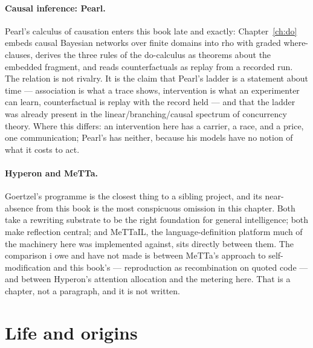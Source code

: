 \paragraph{Causal inference: Pearl.}
Pearl's calculus of causation \cite{Pearl09} enters this book late
and exactly: Chapter~\ref{ch:do} embeds causal Bayesian networks over
finite domains into rho with graded where-clauses, derives the three
rules of the do-calculus as theorems about the embedded fragment, and
reads counterfactuals as replay from a recorded run.
The relation is not rivalry.
It is the claim that Pearl's ladder is a statement about time ---
association is what a trace shows, intervention is what an experimenter
can learn, counterfactual is replay with the record held --- and that
the ladder was already present in the linear/branching/causal spectrum
of concurrency theory.
Where this differs: an intervention here has a carrier, a race, and a
price, one communication; Pearl's has neither, because his models have
no notion of what it costs to act.

\paragraph{Hyperon and MeTTa.}
Goertzel's programme \cite{goertzel2021} is the closest thing to a
sibling project, and its near-absence from this book is the most
conspicuous omission in this chapter.
Both take a rewriting substrate to be the right foundation for
general intelligence; both make reflection central; and MeTTaIL,
the language-definition platform much of the machinery here was
implemented against, sits directly between them.
The comparison i owe and have not made is between MeTTa's
approach to self-modification and this book's --- reproduction as
recombination on quoted code --- and between Hyperon's
attention allocation and the metering here.
That is a chapter, not a paragraph, and it is not written.

\section*{Life and origins}

